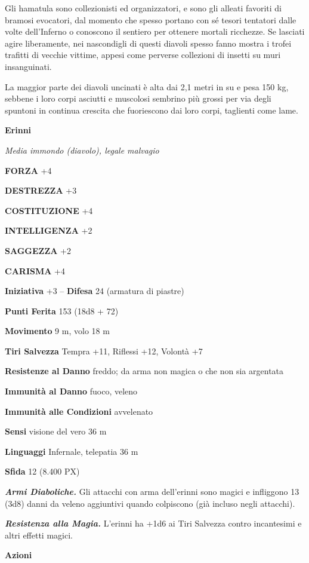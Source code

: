 \begin{multicols}{2}
Gli hamatula sono collezionisti ed organizzatori, e sono gli alleati favoriti di bramosi evocatori, dal momento che spesso portano con sé tesori tentatori dalle volte dell'Inferno o conoscono il sentiero per ottenere mortali ricchezze. Se lasciati agire liberamente, nei nascondigli di questi diavoli spesso fanno mostra i trofei trafitti di vecchie vittime, appesi come perverse collezioni di insetti su muri insanguinati.

La maggior parte dei diavoli uncinati è alta dai 2,1 metri in su e pesa 150 kg, sebbene i loro corpi asciutti e muscolosi sembrino più grossi per via degli spuntoni in continua crescita che fuoriescono dai loro corpi, taglienti come lame.

\medskip{}\textbf{Erinni}

\textit{Media immondo (diavolo), legale malvagio}

\textbf{FORZA} +4

\textbf{DESTREZZA} +3

\textbf{COSTITUZIONE} +4

\textbf{INTELLIGENZA} +2

\textbf{SAGGEZZA} +2

\textbf{CARISMA} +4

\textbf{Iniziativa} +3 -- \textbf{Difesa} 24 (armatura di piastre)

\textbf{Punti Ferita} 153 (18d8 + 72)

\textbf{Movimento} 9 m, volo 18 m

\textbf{Tiri Salvezza} Tempra +11, Riflessi +12, Volontà +7

\textbf{Resistenze al Danno} freddo; da arma non magica o che non sia argentata

\textbf{Immunità al Danno} fuoco, veleno

\textbf{Immunità alle Condizioni} avvelenato

\textbf{Sensi} visione del vero 36 m

\textbf{Linguaggi} Infernale, telepatia 36 m

\textbf{Sfida} 12 (8.400 PX)

\textit{\textbf{Armi Diaboliche.}} Gli attacchi con arma dell'erinni sono magici e infliggono 13 (3d8) danni da veleno aggiuntivi quando colpiscono (già incluso negli attacchi).

\textit{\textbf{Resistenza alla Magia.}} L'erinni ha +1d6 ai Tiri Salvezza contro incantesimi e altri effetti magici.

\textbf{Azioni}


\end{multicols}
